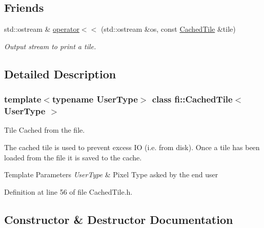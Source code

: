 \subsection*{Friends}
\begin{DoxyCompactItemize}
\item 
std\+::ostream \& \hyperlink{classfi_1_1CachedTile_ad9cf6881c370368b2c7658e6527b3d51}{operator$<$$<$} (std\+::ostream \&os, const \hyperlink{classfi_1_1CachedTile}{Cached\+Tile} \&tile)
\begin{DoxyCompactList}\small\item\em Output stream to print a tile. \end{DoxyCompactList}\end{DoxyCompactItemize}


\subsection{Detailed Description}
\subsubsection*{template$<$typename User\+Type$>$\newline
class fi\+::\+Cached\+Tile$<$ User\+Type $>$}

Tile Cached from the file. 

The cached tile is used to prevent excess IO (i.\+e. from disk). Once a tile has been loaded from the file it is saved to the cache.


\begin{DoxyTemplParams}{Template Parameters}
{\em User\+Type} & Pixel Type asked by the end user \\
\hline
\end{DoxyTemplParams}


Definition at line 56 of file Cached\+Tile.\+h.



\subsection{Constructor \& Destructor Documentation}
\mbox{\label{classfi_1_1CachedTile_a1dd05836168d06224fd540d576e4e6e2}} 
